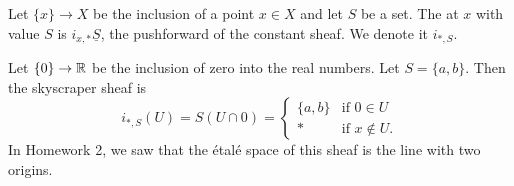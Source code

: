 \begin{defn}
    Let $\{x\} \to X$ be the inclusion of a point $x \in X$ and let \(S\) be a set. The  at $x$ with value $S$ is $i_{x,*}\underline{S}$, the pushforward of the constant sheaf. We denote it $i_{*, S}$.
\end{defn}

\begin{exmp}
    Let $\{0\} \to \mathbb{R}$ be the inclusion of zero into the real numbers. Let $S = \{a,b\}$. Then the skyscraper sheaf is
    \[
        i_{*,S}(U) = S(U \cap 0) =     \begin{cases}
        \{a,b\} & \text{if } 0 \in U\\
        * & \text{if } x \notin U.
    \end{cases}
    \]
    In Homework 2, we saw that the étalé space of this sheaf is the line with two origins.
\end{exmp}
